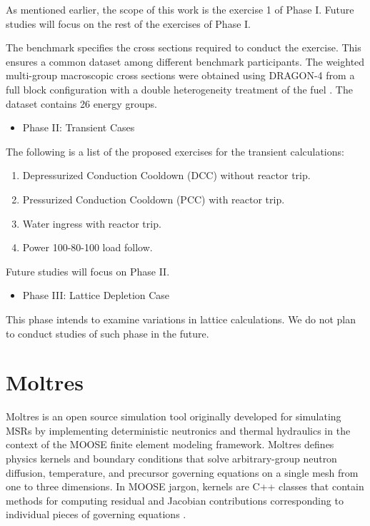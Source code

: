 \documentclass{anstrans}
\begin{document}
As mentioned earlier, the scope of this work is the exercise 1 of Phase I.
Future studies will focus on the rest of the exercises of Phase I.

The benchmark specifies the cross sections required to conduct the exercise.
This ensures a common dataset among different benchmark participants.
The weighted multi-group macroscopic cross sections were obtained using DRAGON-4 \cite{marleau_user_2016}from a full block configuration with a double heterogeneity treatment of the fuel \cite{ortensi_prismatic_2011}.
The dataset contains 26 energy groups.

\begin{itemize}
	\item Phase II: Transient Cases
\end{itemize}

The following is a list of the proposed exercises for the transient calculations:

\begin{enumerate}
	\item Depressurized Conduction Cooldown (DCC) without reactor trip.
	\item Pressurized Conduction Cooldown (PCC) with reactor trip.
	\item Water ingress with reactor trip.
	\item Power 100-80-100 load follow.
\end{enumerate}

Future studies will focus on Phase II.

\begin{itemize}
	\item Phase III: Lattice Depletion Case
\end{itemize}

This phase intends to examine variations in lattice calculations.
We do not plan to conduct studies of such phase in the future.

\section{Moltres}

Moltres is an open source simulation tool originally developed for simulating \glspl{MSR} by implementing deterministic neutronics and thermal hydraulics in the context of the \gls{MOOSE} finite element modeling framework.
Moltres defines physics kernels and boundary conditions that solve arbitrary-group neutron diffusion, temperature, and precursor governing equations on a single mesh from one to three dimensions.
In \gls{MOOSE} jargon, kernels are C++ classes that contain methods for computing residual and Jacobian contributions corresponding to individual pieces of governing equations \cite{lindsay_introduction_2018}.
\end{document}
